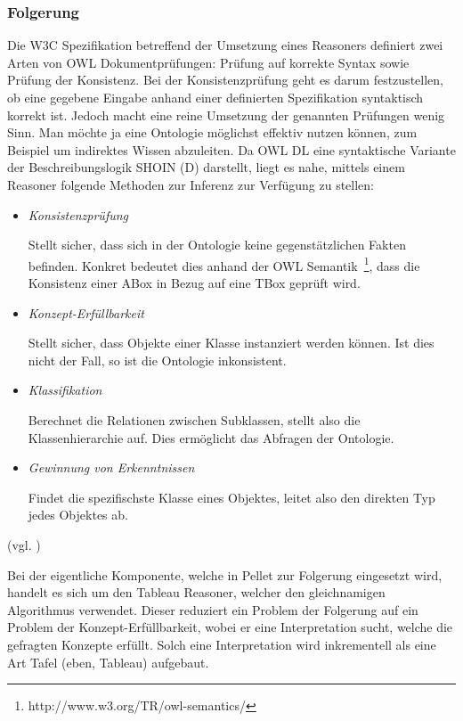 \subsubsection{Folgerung}
\label{subsubsection:folgerung}
Die W3C Spezifikation betreffend der Umsetzung eines Reasoners definiert zwei Arten von OWL Dokumentprüfungen: Prüfung auf korrekte Syntax sowie Prüfung der Konsistenz. Bei der Konsistenzprüfung geht es darum festzustellen, ob eine gegebene Eingabe anhand einer definierten Spezifikation syntaktisch korrekt ist. Jedoch macht eine reine Umsetzung der genannten Prüfungen wenig Sinn. Man möchte ja eine Ontologie möglichst effektiv nutzen können, zum Beispiel um indirektes Wissen abzuleiten.  Da OWL DL eine syntaktische Variante der Beschreibungslogik SHOIN (D) darstellt, liegt es nahe, mittels einem Reasoner folgende Methoden zur Inferenz zur Verfügung zu stellen:
\begin{itemize}
\item \textit{Konsistenzprüfung}

Stellt sicher, dass sich in der Ontologie keine gegenstätzlichen Fakten befinden. Konkret bedeutet dies anhand der OWL Semantik~\footnote{http://www.w3.org/TR/owl-semantics/}, dass die Konsistenz einer ABox in Bezug auf eine TBox geprüft wird.
\item \textit{Konzept-Erfüllbarkeit}

Stellt sicher, dass Objekte einer Klasse instanziert werden können. Ist dies nicht der Fall, so ist die Ontologie inkonsistent.
\item \textit{Klassifikation}

Berechnet die Relationen zwischen Subklassen, stellt also die Klassenhierarchie auf. Dies ermöglicht das Abfragen der Ontologie.
\item \textit{Gewinnung von Erkenntnissen}

Findet die spezifischste Klasse eines Objektes, leitet also den direkten Typ jedes Objektes ab.
\end{itemize}
(vgl. \citet[S. 1 und 2]{sirin:pellet05})

Bei der eigentliche Komponente, welche in Pellet zur Folgerung eingesetzt wird, handelt es sich um den Tableau Reasoner, welcher den gleichnamigen Algorithmus verwendet. Dieser reduziert ein Problem der Folgerung auf ein Problem der Konzept-Erfüllbarkeit, wobei er eine Interpretation sucht, welche die gefragten Konzepte erfüllt. Solch eine Interpretation wird inkrementell als eine Art Tafel (eben, Tableau) aufgebaut.

